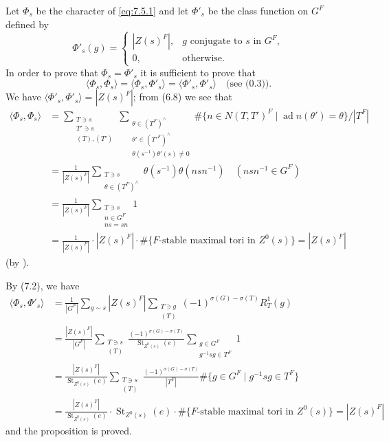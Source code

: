 \documentclass[11pt]{amsart}
\theoremstyle{plain}
\theoremstyle{remark}
\DeclareMathOperator{\ad}{ad}
\DeclareMathOperator{\St}{St}
\begin{document}
Let $\Phi_s$ be the character of \eqref{eq:7.5.1} and let $\Phi'_s$ be the class function on $G^F$ defined by
\[
\Phi'_s(g) = \begin{cases}
|Z(s)^F|, & g \text{ conjugate to } s \text{ in } G^F, \\
0, & \text{otherwise}.
\end{cases}
\]
In order to prove that $\Phi_s = \Phi'_s$ it is sufficient to prove that
\[
\langle \Phi_s, \Phi_s \rangle = \langle \Phi_s, \Phi'_s \rangle = \langle \Phi'_s, \Phi'_s \rangle \quad \text{(see (0.3))}.
\]
We have $\langle \Phi'_s, \Phi'_s \rangle = |Z(s)^F|$; from (6.8) we see that
\begin{align*}
\langle \Phi_s, \Phi_s \rangle &= \sum_{\substack{T \ni s \\ T' \ni s \\ (T), (T')}} \sum_{\substack{\theta \in (T^F)^\wedge \\ \theta' \in (T'^F)^\wedge \\ \theta(s^{-1})\theta'(s) \neq 0}} \#\{n \in N(T, T')^F \mid \ad n(\theta') = \theta\}/|T^F| \\
&= \frac{1}{|Z(s)^F|} \sum_{\substack{T \ni s \\ \theta \in (T^F)^\wedge}} \theta(s^{-1})\theta(nsn^{-1}) \quad (nsn^{-1} \in G^F) \\
&= \frac{1}{|Z(s)^F|} \sum_{\substack{T \ni s \\ n \in G^F \\ ns = sn}} 1 \\
&= \frac{1}{|Z(s)^F|} \cdot |Z(s)^F| \cdot \#\{F\text{-stable maximal tori in }Z^0(s)\} = |Z(s)^F|
\end{align*}
(by \cite[Cor.\ 14.16]{Stein}).

By (7.2), we have
\begin{align*}
\langle \Phi_s, \Phi'_s \rangle &= \frac{1}{|G^F|} \sum_{g \sim s} |Z(s)^F| \sum_{\substack{T \ni g \\ (T)}} (-1)^{\sigma(G) - \sigma(T)} R_T^1(g) \\
&= \frac{|Z(s)^F|}{|G^F|} \sum_{\substack{T \ni s \\ (T)}} \frac{(-1)^{\sigma(G) - \sigma(T)}}{\St_{Z^0(s)}(e)} \sum_{\substack{g \in G^F \\ g^{-1}sg \in T^F}} 1 \\
&= \frac{|Z(s)^F|}{\St_{Z^0(s)}(e)} \sum_{\substack{T \ni s \\ (T)}} \frac{(-1)^{\sigma(G) - \sigma(T)}}{|T^F|} \#\{g \in G^F \mid g^{-1}sg \in T^F\} \\
&= \frac{|Z(s)^F|}{\St_{Z^0(s)}(e)} \cdot \St_{Z^0(s)}(e) \cdot \#\{F\text{-stable maximal tori in }Z^0(s)\} = |Z(s)^F|
\end{align*}
and the proposition is proved.
\end{document}
